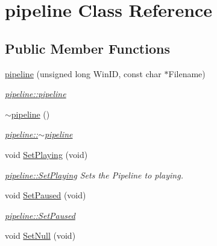 \hypertarget{classpipeline}{\section{pipeline Class Reference}
\label{classpipeline}
}
\subsection*{Public Member Functions}
\begin{DoxyCompactItemize}
\item 
\hyperlink{classpipeline_a6b3597bc480ffca8b2350bf1e7f8afe5}{pipeline} (unsigned long Win\-I\-D, const char $\ast$Filename)
\begin{DoxyCompactList}\small\item\em \hyperlink{classpipeline_a6b3597bc480ffca8b2350bf1e7f8afe5}{pipeline\-::pipeline} \end{DoxyCompactList}\item 
\hypertarget{classpipeline_abcfd0f7d1563886f2f5539b528316092}{\hyperlink{classpipeline_abcfd0f7d1563886f2f5539b528316092}{$\sim$pipeline} ()}\label{classpipeline_abcfd0f7d1563886f2f5539b528316092}

\begin{DoxyCompactList}\small\item\em \hyperlink{classpipeline_abcfd0f7d1563886f2f5539b528316092}{pipeline\-::$\sim$pipeline} \end{DoxyCompactList}\item 
\hypertarget{classpipeline_adb5054fb6710d8d3140c4620cb4e1a73}{void \hyperlink{classpipeline_adb5054fb6710d8d3140c4620cb4e1a73}{Set\-Playing} (void)}\label{classpipeline_adb5054fb6710d8d3140c4620cb4e1a73}

\begin{DoxyCompactList}\small\item\em \hyperlink{classpipeline_adb5054fb6710d8d3140c4620cb4e1a73}{pipeline\-::\-Set\-Playing} Sets the Pipeline to playing. \end{DoxyCompactList}\item 
void \hyperlink{classpipeline_a938a4d81ca42711464a835849099c473}{Set\-Paused} (void)
\begin{DoxyCompactList}\small\item\em \hyperlink{classpipeline_a938a4d81ca42711464a835849099c473}{pipeline\-::\-Set\-Paused} \end{DoxyCompactList}\item 
\hypertarget{classpipeline_a2d491af7f94ea87a4495b861a8a121fb}{void \hyperlink{classpipeline_a2d491af7f94ea87a4495b861a8a121fb}{Set\-Null} (void)}\label{classpipeline_a2d491af7f94ea87a4495b861a8a121fb}


\end{DoxyCompactItemize}
